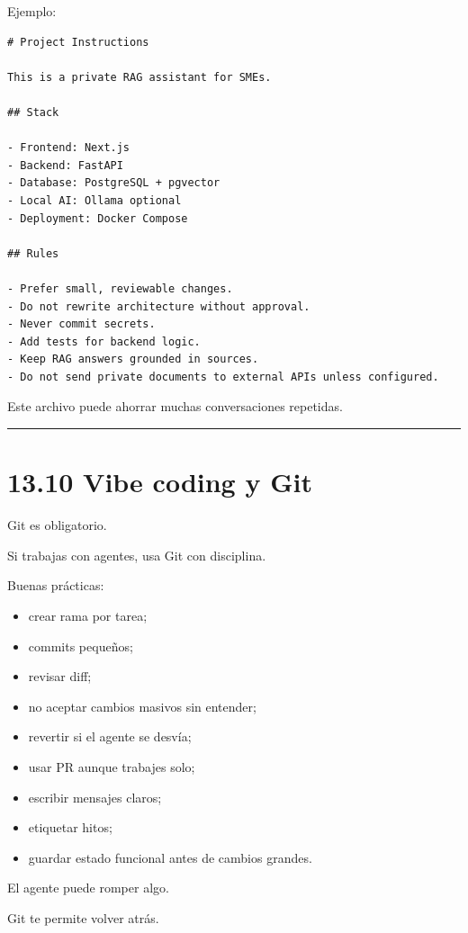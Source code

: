 Ejemplo:

\begin{lstlisting}
# Project Instructions

This is a private RAG assistant for SMEs.

## Stack

- Frontend: Next.js
- Backend: FastAPI
- Database: PostgreSQL + pgvector
- Local AI: Ollama optional
- Deployment: Docker Compose

## Rules

- Prefer small, reviewable changes.
- Do not rewrite architecture without approval.
- Never commit secrets.
- Add tests for backend logic.
- Keep RAG answers grounded in sources.
- Do not send private documents to external APIs unless configured.
\end{lstlisting}

Este archivo puede ahorrar muchas conversaciones repetidas.

\begin{center}\rule{0.5\linewidth}{0.5pt}\end{center}

\section{13.10 Vibe coding y Git}\label{vibe-coding-y-git}

Git es obligatorio.

Si trabajas con agentes, usa Git con disciplina.

Buenas prácticas:

\begin{itemize}
\tightlist
\item
  crear rama por tarea;
\item
  commits pequeños;
\item
  revisar diff;
\item
  no aceptar cambios masivos sin entender;
\item
  revertir si el agente se desvía;
\item
  usar PR aunque trabajes solo;
\item
  escribir mensajes claros;
\item
  etiquetar hitos;
\item
  guardar estado funcional antes de cambios grandes.
\end{itemize}

El agente puede romper algo.

Git te permite volver atrás.

